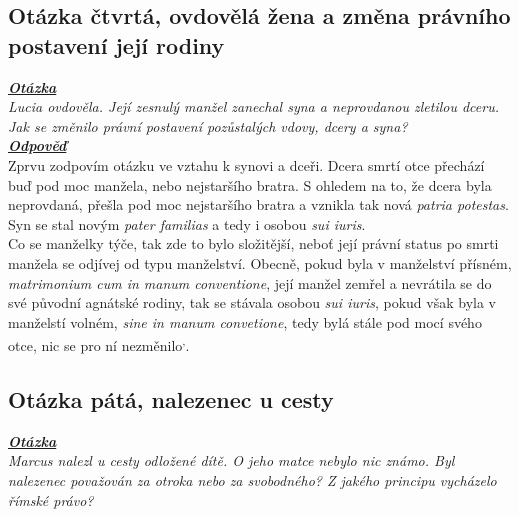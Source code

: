 \documentclass{article}
\begin{document}


\subsection{Otázka čtvrtá, ovdovělá žena a změna právního postavení její rodiny}
\textbf{\textit{\underline{Otázka}}}\\

\textit{Lucia ovdověla. Její zesnulý manžel zanechal syna a neprovdanou zletilou dceru. Jak se změnilo právní postavení pozůstalých vdovy, dcery a syna?}\\

\noindent\textbf{\textit{\underline{Odpověď}}}\\


Zprvu zodpovím otázku ve vztahu k synovi a dceři. Dcera smrtí otce přechází buď pod moc manžela, nebo nejstaršího bratra. S ohledem na to, že dcera byla neprovdaná, přešla pod moc nejstaršího bratra a vznikla tak nová \textit{patria potestas}. Syn se stal novým \textit{pater familias} a tedy i osobou \textit{sui iuris}.\\

Co se manželky týče, tak zde to bylo složitější, neboť její právní status po smrti manžela se odjívej od typu manželství. Obecně, pokud byla v manželství přísném, \textit{matrimonium cum in manum
conventione}, její manžel zemřel a nevrátila se do své původní agnátské rodiny, tak se stávala osobou \textit{sui iuris}, pokud však byla v manželstí volném, \textit{sine in manum convetione}, tedy bylá stále pod mocí svého otce, nic se pro ní nezměnilo\textsuperscript{,}.

\subsection{Otázka pátá, nalezenec u cesty}
\textbf{\textit{\underline{Otázka}}}\\
\textit{Marcus nalezl u cesty odložené dítě. O jeho matce nebylo nic známo. Byl nalezenec považován za otroka nebo za svobodného? Z jakého principu vycházelo římské právo?}\\
\end{document}
